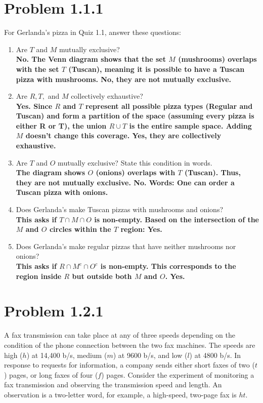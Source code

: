 \documentclass{article}
\begin{document}
\section*{Problem 1.1.1}
For Gerlanda's pizza in Quiz 1.1, answer these questions:
\begin{enumerate}[label=(\alph*)]
    \item Are $T$ and $M$ mutually exclusive? \\
    {\boldmath\textbf{No. The Venn diagram shows that the set $M$ (mushrooms) overlaps with the set $T$ (Tuscan), meaning it is possible to have a Tuscan pizza with mushrooms. No, they are not mutually exclusive.}}
    
    \item Are $R, T,$ and $M$ collectively exhaustive? \\
    {\boldmath\textbf{Yes. Since $R$ and $T$ represent all possible pizza types (Regular and Tuscan) and form a partition of the space (assuming every pizza is either R or T), the union $R \cup T$ is the entire sample space. Adding $M$ doesn't change this coverage. Yes, they are collectively exhaustive.}}
    
    \item Are $T$ and $O$ mutually exclusive? State this condition in words. \\
    {\boldmath\textbf{The diagram shows $O$ (onions) overlaps with $T$ (Tuscan). Thus, they are not mutually exclusive. No. Words: One can order a Tuscan pizza with onions.}}
    
    \item Does Gerlanda's make Tuscan pizzas with mushrooms and onions? \\
    {\boldmath\textbf{This asks if $T \cap M \cap O$ is non-empty. Based on the intersection of the $M$ and $O$ circles within the $T$ region: Yes.}}
    
    \item Does Gerlanda's make regular pizzas that have neither mushrooms nor onions? \\
    {\boldmath\textbf{This asks if $R \cap M^c \cap O^c$ is non-empty. This corresponds to the region inside $R$ but outside both $M$ and $O$. Yes.}}
\end{enumerate}

\newpage

\section*{Problem 1.2.1}
A fax transmission can take place at any of three speeds depending on the condition of the phone connection between the two fax machines. The speeds are high ($h$) at 14,400 b/s, medium ($m$) at 9600 b/s, and low ($l$) at 4800 b/s. In response to requests for information, a company sends either short faxes of two ($t$) pages, or long faxes of four ($f$) pages. Consider the experiment of monitoring a fax transmission and observing the transmission speed and length. An observation is a two-letter word, for example, a high-speed, two-page fax is $ht$.
\end{document}

